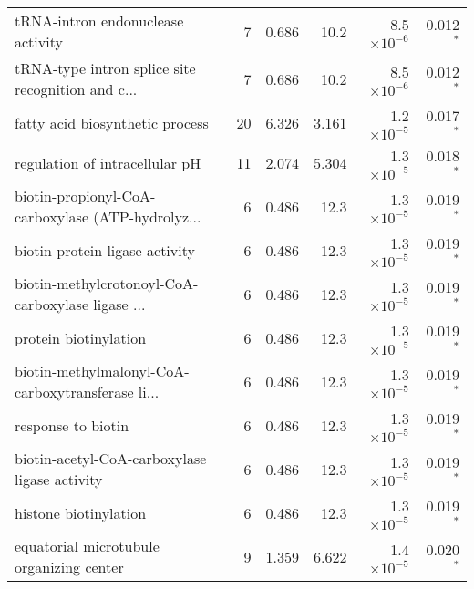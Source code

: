 \begin{longtable}{|l|r|r|r|r|r|}
                 tRNA-intron endonuclease activity &                       7 &                   0.686 &       10.2 &  8.5$\times 10^{-6}$ &                 0.012$\bm{^*}$ \\
 tRNA-type intron splice site recognition and c... &                       7 &                   0.686 &       10.2 &  8.5$\times 10^{-6}$ &                 0.012$\bm{^*}$ \\
                   fatty acid biosynthetic process &                      20 &                   6.326 &      3.161 &  1.2$\times 10^{-5}$ &                 0.017$\bm{^*}$ \\
                    regulation of intracellular pH &                      11 &                   2.074 &      5.304 &  1.3$\times 10^{-5}$ &                 0.018$\bm{^*}$ \\
 biotin-propionyl-CoA-carboxylase (ATP-hydrolyz... &                       6 &                   0.486 &       12.3 &  1.3$\times 10^{-5}$ &                 0.019$\bm{^*}$ \\
                    biotin-protein ligase activity &                       6 &                   0.486 &       12.3 &  1.3$\times 10^{-5}$ &                 0.019$\bm{^*}$ \\
 biotin-methylcrotonoyl-CoA-carboxylase ligase ... &                       6 &                   0.486 &       12.3 &  1.3$\times 10^{-5}$ &                 0.019$\bm{^*}$ \\
                             protein biotinylation &                       6 &                   0.486 &       12.3 &  1.3$\times 10^{-5}$ &                 0.019$\bm{^*}$ \\
 biotin-methylmalonyl-CoA-carboxytransferase li... &                       6 &                   0.486 &       12.3 &  1.3$\times 10^{-5}$ &                 0.019$\bm{^*}$ \\
                                response to biotin &                       6 &                   0.486 &       12.3 &  1.3$\times 10^{-5}$ &                 0.019$\bm{^*}$ \\
     biotin-acetyl-CoA-carboxylase ligase activity &                       6 &                   0.486 &       12.3 &  1.3$\times 10^{-5}$ &                 0.019$\bm{^*}$ \\
                             histone biotinylation &                       6 &                   0.486 &       12.3 &  1.3$\times 10^{-5}$ &                 0.019$\bm{^*}$ \\
          equatorial microtubule organizing center &                       9 &                   1.359 &      6.622 &  1.4$\times 10^{-5}$ &                 0.020$\bm{^*}$ \\

\end{longtable}
